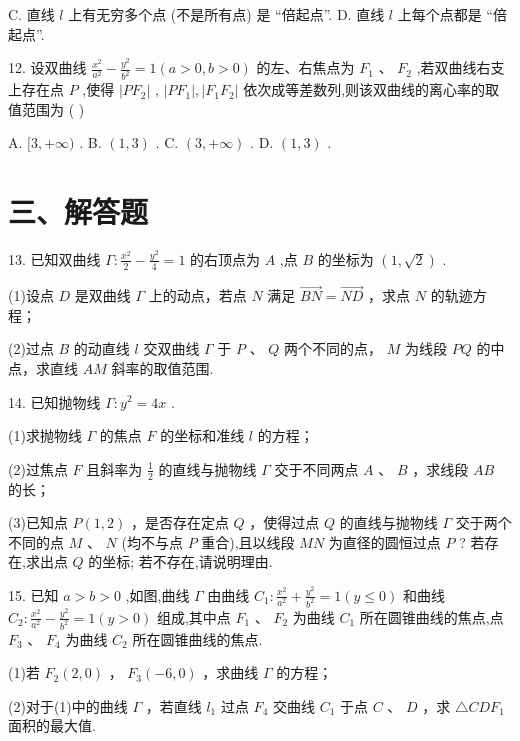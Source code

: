 C. 直线 $l$ 上有无穷多个点 (不是所有点) 是 “倍起点”. D. 直线 $l$ 上每个点都是 “倍起点”.

12. 设双曲线 $\frac{{x}^{2}}{{a}^{2}} - \frac{{y}^{2}}{{b}^{2}} = 1\left( {a > 0,b > 0}\right)$ 的左、右焦点为 ${F}_{1}\text{ 、 }{F}_{2}$ ,若双曲线右支上存在点 $P$ ,使得 $\left| {P{F}_{2}}\right|$ , $\left| {P{F}_{1}}\right| ,\left| {{F}_{1}{F}_{2}}\right|$ 依次成等差数列,则该双曲线的离心率的取值范围为 ( )

A. $\lbrack 3, + \infty )$ . B. $\left( {1,3}\right)$ . C. $\left( {3, + \infty }\right)$ . D. $\left( {1,3}\right)$ .

\section*{三、解答题}

13. 已知双曲线 $\Gamma  : \frac{{x}^{2}}{2} - \frac{{y}^{2}}{4} = 1$ 的右顶点为 $A$ ,点 $B$ 的坐标为 $\left( {1,\sqrt{2}}\right)$ .

(1)设点 $D$ 是双曲线 $\Gamma$ 上的动点，若点 $N$ 满足 $\overrightarrow{BN} = \overrightarrow{ND}$ ，求点 $N$ 的轨迹方程；

(2)过点 $B$ 的动直线 $l$ 交双曲线 $\Gamma$ 于 $P$ 、 $Q$ 两个不同的点， $M$ 为线段 ${PQ}$ 的中点，求直线 ${AM}$ 斜率的取值范围.

14. 已知抛物线 $\Gamma  : {y}^{2} = {4x}$ .

(1)求抛物线 $\Gamma$ 的焦点 $F$ 的坐标和准线 $l$ 的方程；

(2)过焦点 $F$ 且斜率为 $\frac{1}{2}$ 的直线与抛物线 $\Gamma$ 交于不同两点 $A$ 、 $B$ ，求线段 ${AB}$ 的长；

(3)已知点 $P\left( {1,2}\right)$ ，是否存在定点 $Q$ ，使得过点 $Q$ 的直线与抛物线 $\Gamma$ 交于两个不同的点 $M$ 、 $N$ (均不与点 $P$ 重合),且以线段 ${MN}$ 为直径的圆恒过点 $P$ ? 若存在,求出点 $Q$ 的坐标; 若不存在,请说明理由.


15. 已知 $a > b > 0$ ,如图,曲线 $\Gamma$ 由曲线 ${C}_{1} : \frac{{x}^{2}}{{a}^{2}} + \frac{{y}^{2}}{{b}^{2}} = 1\left( {y \leq  0}\right)$ 和曲线 ${C}_{2} : \frac{{x}^{2}}{{a}^{2}} - \frac{{y}^{2}}{{b}^{2}} = 1\left( {y > 0}\right)$ 组成,其中点 ${F}_{1}\text{ 、 }{F}_{2}$ 为曲线 ${C}_{1}$ 所在圆锥曲线的焦点,点 ${F}_{3}\text{ 、 }{F}_{4}$ 为曲线 ${C}_{2}$ 所在圆锥曲线的焦点.

(1)若 ${F}_{2}\left( {2,0}\right)$ ， ${F}_{3}\left( {-6,0}\right)$ ，求曲线 $\Gamma$ 的方程；

(2)对于(1)中的曲线 $\Gamma$ ，若直线 ${l}_{1}$ 过点 ${F}_{4}$ 交曲线 ${C}_{1}$ 于点 $C$ 、 $D$ ，求 $\bigtriangleup  {CD}{F}_{1}$ 面积的最大值.

